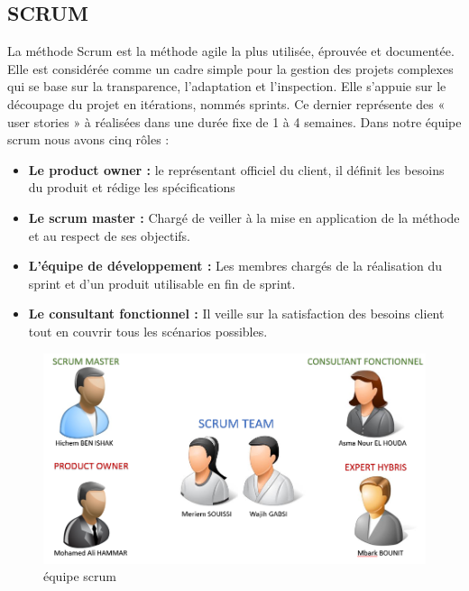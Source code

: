 \subsection{SCRUM}
La méthode Scrum est la méthode agile la plus utilisée, éprouvée et documentée. Elle est considérée comme un cadre simple pour la gestion des projets complexes qui se base sur la transparence, l’adaptation et l’inspection. Elle s’appuie sur le découpage du projet en itérations, nommés sprints. Ce dernier représente des « user stories » à réalisées dans une durée fixe de 1 à 4 semaines.
Dans notre équipe scrum nous avons cinq rôles : 
\begin{itemize}[label=\textbullet,font=\normalsize]
\addtolength{\itemindent}{1cm}
\item \textbf{Le product owner : } le représentant officiel du client, il définit les besoins du produit et rédige les spécifications
\item \textbf{Le scrum master :} Chargé de veiller à la mise en application de la méthode et au respect de ses objectifs.
\item \textbf{ L’équipe de développement :} Les membres chargés de la réalisation du sprint et d’un produit utilisable en fin de sprint. 
\item \textbf{Le consultant fonctionnel :} Il veille sur la satisfaction des besoins client tout en couvrir tous les scénarios possibles.

\end{itemize}

\begin{figure}[H]
\centering
\includegraphics[width=0.7\columnwidth]{images/equipe_scrum.png}
\caption{équipe scrum}
\label{fig:Mod-Enseig}
\end{figure} 

